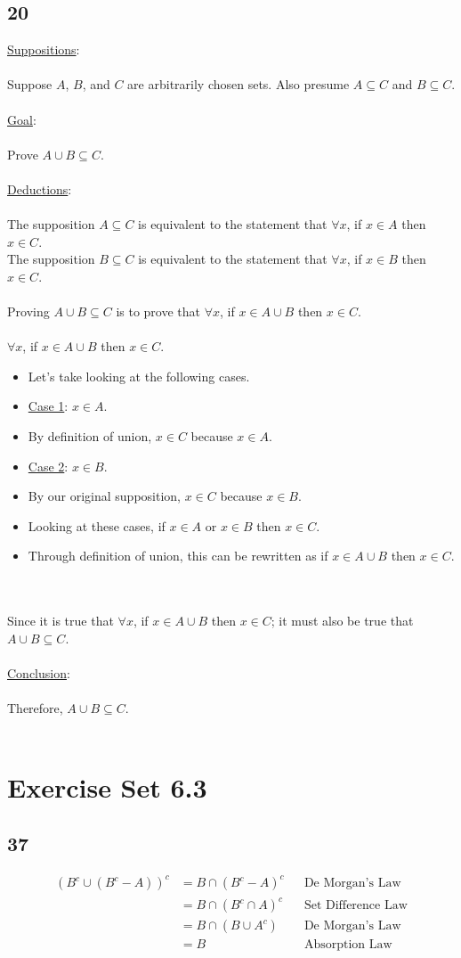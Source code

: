 \documentclass[12pt]{article}
\newcommand{\xlist}[1]{
    \begin{itemize}
        \renewcommand{\labelitemi}{$\centerdot$}
        #1
    \end{itemize}
    \newblock
    \\ \\
}
\newcommand{\xsupposition}[1]{
    \underline{Suppositions}:
    \\ \\
    #1
    \\ \\
}
\newcommand{\xgoal}[1]{
    \underline{Goal}:
    \\ \\
    #1
    \\ \\
}
\newcommand{\xdeduction}{
    \underline{Deductions}:
    \\ \\
}
\newcommand{\xconclusion}[1]{
    \underline{Conclusion}:
    \\ \\
    #1
    \\ \\
}
\begin{document}
\subsection*{20}
\xsupposition{Suppose $A$, $B$, and $C$ are arbitrarily chosen sets. Also presume $A \subseteq C$ and $B \subseteq C$.}
\xgoal{Prove $A \cup B \subseteq C$.}
\xdeduction
The supposition $A \subseteq C$ is equivalent to the statement that $\forall x$, if $x \in A$ then $x \in C$. \\
The supposition $B \subseteq C$ is equivalent to the statement that $\forall x$, if $x \in B$ then $x \in C$.
\\ \\
Proving $A \cup B \subseteq C$ is to prove that $\forall x$, if $x \in A \cup B$ then $x \in C$. 
\\ \\
$\forall x$, if $x \in A \cup B$ then $x \in C$.
\xlist{
  \item Let's take looking at the following cases.
  \item \underline {Case 1}: $x \in A$.
  \item By definition of union, $x \in C$ because $x \in A$.
  \item \underline{Case 2}: $x \in B$.
  \item By our original supposition, $x \in C$ because $x \in B$.
  \item Looking at these cases, if $x \in A$ or $x \in B$ then $x \in C$.
  \item Through definition of union, this can be rewritten as if $x \in A \cup B$ then $x \in C$.
}
Since it is true that  $\forall x$, if $x \in A \cup B$ then $x \in C$; it must also be true that $A \cup B \subseteq C$.
\\ \\
\xconclusion{Therefore, $A \cup B \subseteq C$.}

\section*{Exercise Set 6.3}

\subsection*{37}
\begin{align*}
  (B^c \cup (B^c - A))^c &= B \cap (B^c - A)^c && \text{De Morgan's Law}\\
  &= B \cap (B^c \cap A)^c && \text{Set Difference Law}\\
  &= B \cap (B \cup A^c) && \text{De Morgan's Law}\\
  &= B && \text{Absorption Law}\\
\end{align*}
\end{document}
